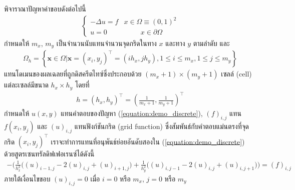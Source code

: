 \begin{Example}
    พิจาราณาปัญหาค่าขอบดังต่อไปนี้
    \begin{align}
        \left \{ \begin{array}{ll}   -\Delta u = f & x \in \Omega \equiv	(0,1)^2	 \\
        u = 0 & \hspace{1cm} x \in \partial \Omega \end{array} \right . 
        \label{equation:demo_discrete}
    \end{align}
    \hspace{1cm} กำหนดให้ $m_x$, $m_y$ เป็นจำนวนนับแทนจำนวนจุดกริดในทาง $x$ และทาง $y$ ตามลำดับ และ
    \begin{align*}
        \Omega_{h}=\left\{ \mathbf{x} \in \Omega | \mathbf{x}=(x_i,y_j)^{\top} = (ih_x,jh_y), 1 \leq i \leq m_x, 1 \leq j \leq m_y  \right\}
    \end{align*}
    แทนโดเมนของผลเฉลยที่ถูกดิสครีตไทซ์ซึ่งประกอบด้วย $(m_x+1) \times (m_y+1)$ เซลล์ (cell) แต่ละเซลล์มีขนาด $h_x \times h_y$ โดยที่
    \begin{align*}
        h = (h_x,h_y)^{\top} = (\frac{1}{m_x+1},\frac{1}{m_y+1})^{\top}
    \end{align*}
    กำหนดให้ $u(x,y)$ แทนคำตอบของปัญหา (\ref{equation:demo_discrete}), $(f)_{i,j}$ แทน $f(x_i,y_j)$ และ $(u)_{i,j}$ แทนฟังก์ชันกริด (grid function) ซึ่งสัมพันธ์กับคำตอบแม่นตรงที่จุดกริด $(x_i,y_j)^{\top}$ เราจะทำการแทนที่อนุพันธ์ย่อยอันดับสองใน  (\ref{equation:demo_discrete}) ด้วยสูตรเซนทรัลดิฟเฟอเรนซ์ได้ดังนี้
    \begin{align}
        - \Big( \frac{1}{h_x^2} \big( (u)_{i-1,j} - 2(u)_{i,j} + (u)_{i+1,j}\big) + \frac{1}{h_y^2} \big( (u)_{i,j-1} - 2(u)_{i,j} + (u)_{i,j+1}\big) \Big) = (f)_{i,j}
    \end{align}
    ภายใต้เงื่อนไขขอบ $(u)_{i,j} = 0$ เมื่อ $i = 0$ หรือ $m_x$, $j = 0$ หรือ $m_y$ 
\end{Example}